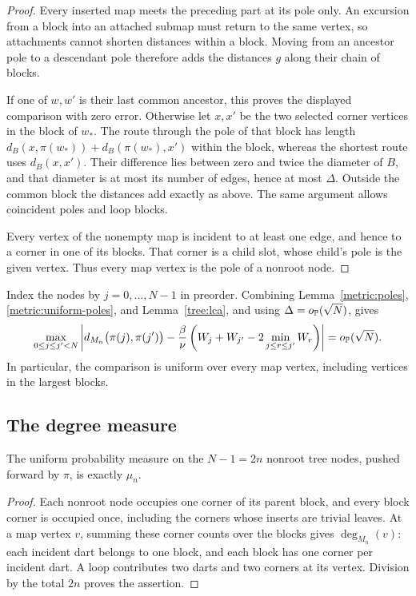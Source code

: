 \begin{proof}
Every inserted map meets the preceding part at its pole only.
An excursion from a block into an attached submap must return to the
same vertex, so attachments cannot shorten distances within a block.
Moving from an ancestor pole to a descendant pole therefore adds
the distances $g$ along their chain of blocks.

If one of $w,w'$ is their last common ancestor, this proves the
displayed comparison with zero error. Otherwise let $x,x'$ be the two
selected corner vertices in the block of $w_*$. The route through
the pole of that block has length
$d_B(x,\pi(w_*))+d_B(\pi(w_*),x')$ within the block, whereas the
shortest route uses $d_B(x,x')$. Their difference lies between zero
and twice the diameter of $B$, and that diameter is at most its
number of edges, hence at most $\Delta$. Outside the common block
the distances add exactly as above. The same argument allows
coincident poles and loop blocks.

Every vertex of the nonempty map is incident to at least one edge,
and hence to a corner in one of its blocks. That corner is a child
slot, whose child's pole is the given vertex. Thus every map vertex
is the pole of a nonroot node.
\end{proof}

Index the nodes by $j=0,\ldots,N-1$ in preorder. Combining
Lemma~\ref{metric:poles}, \eqref{metric:uniform-poles}, and
Lemma~\ref{tree:lca}, and using $\Delta=o_{\mathbb P}(\sqrt N)$, gives
\begin{equation}\label{metric:walk-comparison}
 \max_{0\le j\le j'<N}
 \left|d_{M_n}\big(\pi(j),\pi(j')\big)
  -\frac{\beta}{\nu}
       \left(W_j+W_{j'}-2\min_{j\le r\le j'}W_r\right)\right|
   =o_{\mathbb P}(\sqrt N).
\end{equation}
In particular, the comparison is uniform over every map vertex,
including vertices in the largest blocks.

\subsection{The degree measure}

\begin{lemma}\label{metric:measure}
The uniform probability measure on the $N-1=2n$ nonroot tree nodes,
pushed forward by $\pi$, is exactly $\mu_n$.
\end{lemma}

\begin{proof}
Each nonroot node occupies one corner of its parent block, and every
block corner is occupied once, including the corners whose inserts
are trivial leaves. At a map vertex $v$, summing these corner counts
over the blocks gives $\deg_{M_n}(v)$: each incident dart belongs to
one block, and each block has one corner per incident dart. A loop
contributes two darts and two corners at its vertex.
Division by the total $2n$ proves the assertion.
\end{proof}

